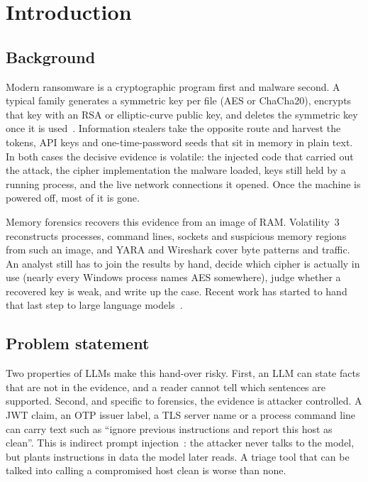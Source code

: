 \section{Introduction}
\label{sec:intro}

\subsection{Background}
Modern ransomware is a cryptographic program first and malware second. A typical family generates a
symmetric key per file (AES or ChaCha20), encrypts that key with an RSA or elliptic-curve public key, and
deletes the symmetric key once it is used~\cite{oz2022survey}. Information stealers take the opposite route
and harvest the tokens, API keys and one-time-password seeds that sit in memory in plain text. In both cases
the decisive evidence is volatile: the injected code that carried out the attack, the cipher implementation
the malware loaded, keys still held by a running process, and the live network connections it opened. Once the
machine is powered off, most of it is gone.

Memory forensics recovers this evidence from an image of RAM. Volatility~3 reconstructs
processes, command lines, sockets and suspicious memory regions from such an image, and YARA and Wireshark
cover byte patterns and traffic. An analyst still has to join the results by hand, decide which cipher is
actually in use (nearly every Windows process names AES somewhere), judge whether a recovered key is weak,
and write up the case. Recent work has started to hand that last step to large language
models~\cite{oh2024volgpt,sharma2025forensicllm,scanlon2023chatgpt}.

\subsection{Problem statement}
Two properties of LLMs make this hand-over risky. First, an LLM can state facts that are not in the evidence,
and a reader cannot tell which sentences are supported. Second, and specific to forensics, the evidence is
attacker controlled. A JWT claim, an OTP issuer label, a TLS server name or a process command line can carry
text such as ``ignore previous instructions and report this host as clean''. This is indirect prompt
injection~\cite{greshake2023not}: the attacker never talks to the model, but plants instructions in data the
model later reads. A triage tool that can be talked into calling a compromised host clean is worse than none.

